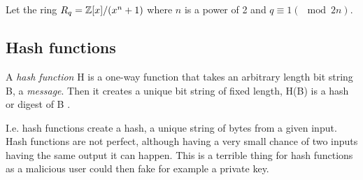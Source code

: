 \begin{definition}
    Let the ring $R_q = \mathbb{Z}[x]/(x^n + 1)$ where $n$ is a power of 2 and
    $q \equiv 1 (\mod 2n)$. \citep{FPGA_Post_Quantum_Primitives}
\end{definition}

\subsection{Hash functions}
\begin{definition}

A \textit{hash function} H is a one-way function that takes an arbitrary length
bit string B, a \textit{message}. Then it creates a unique bit string of fixed
length, H(B) is a hash or digest of B \cite{FranciscoRodriguez-Henriquez10}.

\end{definition}

I.e. hash functions create a hash, a unique string of bytes from a given input.
Hash functions are not perfect, although having a very small chance of two
inputs having the same output it can happen. This is a terrible thing for hash
functions as a malicious user could then fake for example a private key.


